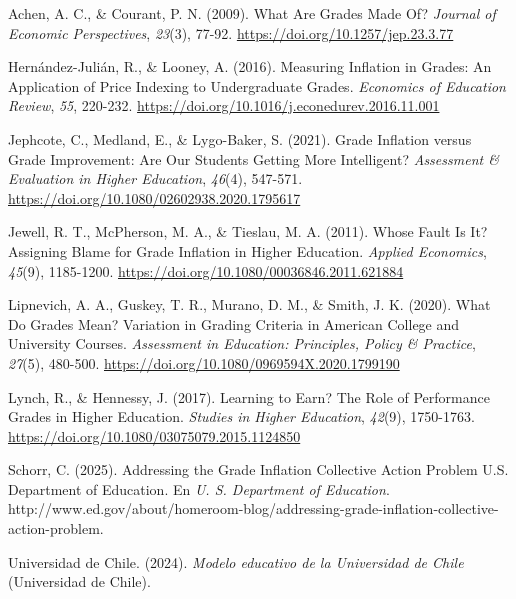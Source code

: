 \documentclass[
  spanish,
  a4paper,
  oneside]{scrbook}
\newlength{\cslhangindent}
\newenvironment{CSLReferences}[2] %
 {\begin{list}{}{%
  \setlength{\itemindent}{0pt}
  \setlength{\leftmargin}{0pt}
  \setlength{\parsep}{0pt}
  \ifodd #1
   \setlength{\leftmargin}{\cslhangindent}
   \setlength{\itemindent}{-1\cslhangindent}
  \fi
  \setlength{\itemsep}{#2\baselineskip}}}
 {\end{list}}
\begin{document}
\label{refs}
\begin{CSLReferences}{1}{0}
Achen, A. C., \& Courant, P. N. (2009). What Are Grades Made Of?
\emph{Journal of Economic Perspectives}, \emph{23}(3), 77-92.
\url{https://doi.org/10.1257/jep.23.3.77}

Hernández-Julián, R., \& Looney, A. (2016). Measuring Inflation in
Grades: An Application of Price Indexing to Undergraduate Grades.
\emph{Economics of Education Review}, \emph{55}, 220-232.
\url{https://doi.org/10.1016/j.econedurev.2016.11.001}

Jephcote, C., Medland, E., \& Lygo-Baker, S. (2021). Grade Inflation
versus Grade Improvement: Are Our Students Getting More Intelligent?
\emph{Assessment \& Evaluation in Higher Education}, \emph{46}(4),
547-571. \url{https://doi.org/10.1080/02602938.2020.1795617}

Jewell, R. T., McPherson, M. A., \& Tieslau, M. A. (2011). Whose Fault
Is It? Assigning Blame for Grade Inflation in Higher Education.
\emph{Applied Economics}, \emph{45}(9), 1185-1200.
\url{https://doi.org/10.1080/00036846.2011.621884}

Lipnevich, A. A., Guskey, T. R., Murano, D. M., \& Smith, J. K. (2020).
What Do Grades Mean? Variation in Grading Criteria in American College
and University Courses. \emph{Assessment in Education: Principles,
Policy \& Practice}, \emph{27}(5), 480-500.
\url{https://doi.org/10.1080/0969594X.2020.1799190}

Lynch, R., \& Hennessy, J. (2017). Learning to Earn? The Role of
Performance Grades in Higher Education. \emph{Studies in Higher
Education}, \emph{42}(9), 1750-1763.
\url{https://doi.org/10.1080/03075079.2015.1124850}

Schorr, C. (2025). Addressing the Grade Inflation Collective Action
Problem \textbar{} U.S. Department of Education. En \emph{U. S.
Department of Education}.
http://www.ed.gov/about/homeroom-blog/addressing-grade-inflation-collective-action-problem.

Universidad de Chile. (2024). \emph{Modelo educativo de la Universidad
de Chile} (Universidad de Chile).

\end{CSLReferences}
\end{document}
